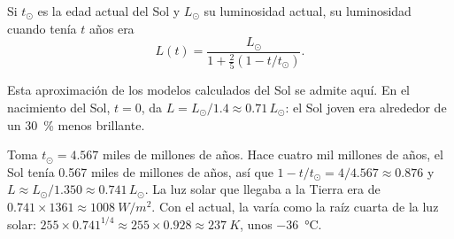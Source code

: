 \begin{proposition}\label{prop:g12:early-earth:luminosity}
Si $t_\odot$ es la edad actual del Sol y $L_\odot$ su luminosidad actual, su
luminosidad cuando tenía $t$ años era
\[
  L(t) = \frac{L_\odot}{1 + \frac{2}{5}\left(1 - t/t_\odot\right)} .
\]
\end{proposition}

Esta aproximación de los modelos calculados del Sol se admite aquí. En el
nacimiento del Sol, $t = 0$, da $L = L_\odot/1.4 \approx 0.71\,L_\odot$: el
Sol joven era alrededor de un \qty{30}{\percent} menos brillante.

\begin{example}\label{ex:g12:early-earth:young-sun}
Toma $t_\odot = 4.567$ miles de millones de años. Hace cuatro mil millones de
años, el Sol tenía 0.567 miles de millones de años, así que $1 - t/t_\odot = 4/4.567 \approx 0.876$ y
$L \approx L_\odot/1.350 \approx 0.741\,L_\odot$. La luz solar que llegaba a
la Tierra era de $0.741 \times 1361 \approx \qty{1008}{W/m^2}$. Con el 
actual, la  varía como la raíz cuarta de la luz
solar: $255 \times 0.741^{1/4} \approx 255 \times 0.928 \approx
\qty{237}{K}$, unos \qty{-36}{\celsius}.
\end{example}

